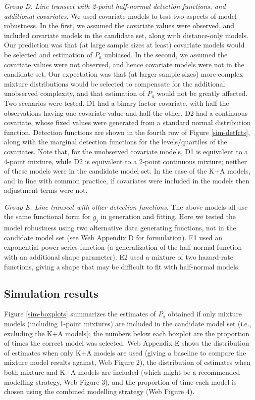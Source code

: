 \documentclass[useAMS,referee,usenatbib]{biom}
\begin{document}
\textit{Group D. Line transect with 2-point half-normal detection functions, and additional covariates.}  We used covariate models to test two aspects of model robustness. In the first, we assumed the covariate values were observed, and included covariate models in the candidate set, along with distance-only models. Our prediction was that (at large sample sizes at least) covariate models would be selected and estimation of $P_a$ unbiased.  In the second, we assumed the covariate values were not observed, and hence covariate models were not in the candidate set.  Our expectation was that (at larger sample sizes) more complex mixture distributions would be selected to compensate for the additional unobserved complexity, and that estimation of $P_a$ would not be greatly affected.  Two scenarios were tested.  D1 had a binary factor covariate, with half the observations having one covariate value and half the other.  D2 had a continuous covariate, whose fixed values were generated from a standard normal distribution function.  Detection functions are shown in the fourth row of Figure \ref{sim-detfcts}, along with the marginal detection functions for the levels/quartiles of the covariates. Note that, for the unobserved covariate models, D1 is equivalent to a 4-point mixture, while D2 is equivalent to a 2-point continuous mixture; neither of these models were in the candidate model set.  In the case of the K+A models, and in line with common practice, if covariates were included in the models then adjustment terms were not.

\textit{Group E. Line transect with other detection functions.} The above models all use the same functional form for $g_j$ in generation and fitting.  Here we tested the model robustness using two alternative data generating functions, not in the candidate model set (see Web Appendix D for formulation).  E1 used an exponential power series function (a generalization of the half-normal function with an additional shape parameter); E2 used a mixture of two hazard-rate functions, giving a shape that may be difficult to fit with half-normal models.
  
\subsection{Simulation results}
\label{s:sims_res}

Figure \ref{sim-boxplots} summarizes the estimates of $P_a$ obtained if only mixture models (including 1-point mixtures) are included in the candidate model set (i.e., excluding the K+A models); the numbers below each boxplot are the proportion of times the correct model was selected.  Web Appendix E shows the distribution of estimates when only K+A models are used (giving a baseline to compare the mixture model results against, Web Figure 2), the distribution of estimates when both mixture and K+A models are included (which might be a recommended modelling strategy, Web Figure 3), and the proportion of time each model is chosen using the combined modelling strategy (Web Figure 4).
\end{document}
